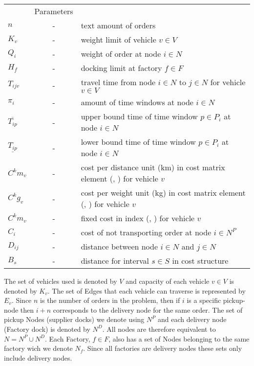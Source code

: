 \documentclass[a4paper,10pt]{article}
\begin{document}
\begin{tabular}{l c l }
    			&Parameters 							\\ 
	$n    	$	&-& text amount of orders 					\\
	$K_v  	$	&-& weight limit of vehicle $v\in V$	 			\\
    	$Q_i  	$	&-& weight of order at node $i\in N$				\\
	$H_f  	$	&-& docking limit at factory $f\in F$				\\
	$T_{ijv}$ 	&-& travel time from node $i\in N$ to $j\in N$ for vehicle 
			    $v\in V$	 						\\
	$\pi_i	$	&-& amount of time windows at node $i\in N$			\\ 
$\overline{T_{ip}} $	&-& upper bound time of time window $p\in P_i$ at node $i\in N$ \\
$\underline{T_{ip}}$	&-& lower bound time of time window $p\in P_i$ at node $i\in N$ \\
	$C^km_{v}	$	&-& cost per distance unit (km) in cost matrix element (\alpha, \beta) for vehicle $v$	\\
	$C^kg_{v}	$	&-& cost per weight unit (kg) in cost matrix element (\alpha, \beta) for vehicle $v$	\\
	$C^km_{v}	$	&-& fixed cost in index (\alpha, \beta) for vehicle $v$	\\
	$C_i	$	&-& cost of not transporting order at node $i\in N^P$ 		\\
	$D_{ij}	$ 	&-& distance between node $i\in N$ and  $j\in N$			\\
    	$B_s 	$	&-& distance for interval $s\in S$ in cost structure		\\
\end{tabular}
\linebreak
\linebreak
\par
The set of vehicles used is denoted by $V$ and capacity of each vehicle $v \in V$ is denoted by $K_v$.
The set of Edges that each vehicle can traverse is represented by $E_v$. 
Since $n$ is the number of orders in the problem, then if $i$ is a specific pickup-node then $i+n$ corresponds to the delivery node for the same order.
The set of pickup Nodes (supplier docks) we denote using $N^P$ and each delivery node (Factory dock) is denoted by $N^D$. 
All nodes are therefore equivalent to $N = N^P \cup N^D$. 
Each Factory, $f \in F$, also has a set of Nodes belonging to the same factory wich we denote $N_f$. Since all factories are delivery nodes these sets only include delivery nodes.
\end{document}
